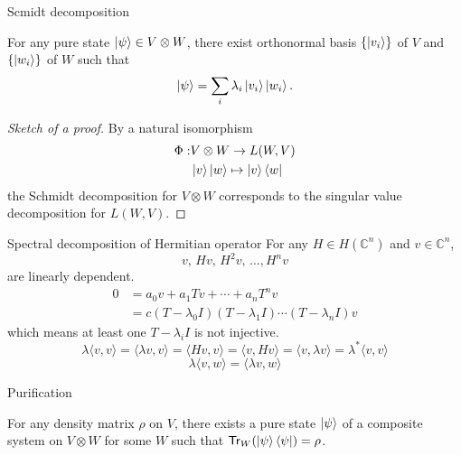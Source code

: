 \documentclass[10pt]{beamer}
\newcommand{\Tr}{\mathsf{Tr}}
\begin{document}
\begin{frame}{Scmidt decomposition}
\begin{theorem}
For any pure state $\ket{\psi}\in V\otimes W$, there exist orthonormal basis $\{\ket{v_i}\}$ of $V$ and $\{\ket{w_i}\}$ of $W$ such that
\begin{equation*}
\ket{\psi}=\sum_i\lambda_i \ket{v_i}\ket{w_i}.
\end{equation*}
\end{theorem}
\begin{proof}[Sketch of a proof]
By a natural isomorphism
\begin{align*}
\Phi:& V\otimes W \to L(W,V)\\
&\ket{v}\ket{w}\mapsto \ket{v}\bra{w}
\end{align*}
the Schmidt decomposition for $V\otimes W$ corresponds to the singular value decomposition for $L(W, V)$.
\end{proof}
\end{frame}
\fi

\begin{frame}{Spectral decomposition of Hermitian operator}
For any $H\in H(\mathbb{C}^n)$ and $v\in \mathbb{C}^n$,
\begin{equation*}
v,\, Hv,\, H^2v,\,\dotsc,H^nv
\end{equation*}
are linearly dependent.
\begin{align*}
0 &= a_0v+a_1 Tv+\dotsb+a_nT^nv\\
 &= c(T-\lambda_0 I)(T-\lambda_1 I)\dotsm(T-\lambda_n I)v
\end{align*}
which means at least one $T-\lambda_i I$ is not injective.
\begin{equation*}
\lambda \langle v, v\rangle
=\langle \lambda v, v\rangle
=\langle H v, v\rangle
=\langle v, H v\rangle
=\langle v, \lambda v\rangle
=\lambda^* \langle v, v\rangle
\end{equation*}
\begin{equation*}
\lambda \langle v, w\rangle
=\langle \lambda v, w\rangle
\end{equation*}

\end{frame}

\begin{frame}{Purification}
\begin{theorem}
For any density matrix $\rho$ on $V$, there exists a pure state $\ket{\psi}$ of a composite system on $V\otimes W$ for some $W$ such that $\Tr_W(\ket{\psi}\bra{\psi})=\rho$.
\end{theorem}
\end{frame}
\fi
\end{document}
